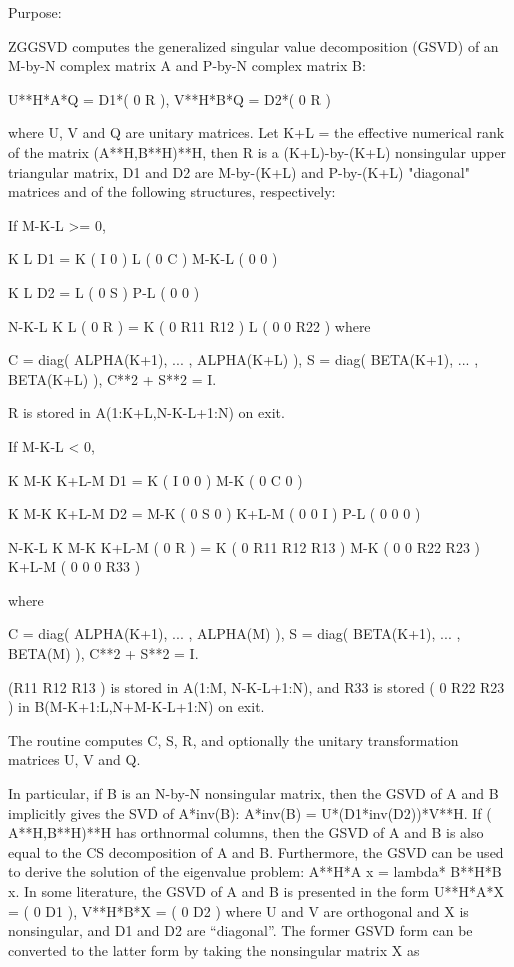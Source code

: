  \begin{DoxyParagraph}{Purpose\+: }
\begin{DoxyVerb} ZGGSVD computes the generalized singular value decomposition (GSVD)
 of an M-by-N complex matrix A and P-by-N complex matrix B:

       U**H*A*Q = D1*( 0 R ),    V**H*B*Q = D2*( 0 R )

 where U, V and Q are unitary matrices.
 Let K+L = the effective numerical rank of the
 matrix (A**H,B**H)**H, then R is a (K+L)-by-(K+L) nonsingular upper
 triangular matrix, D1 and D2 are M-by-(K+L) and P-by-(K+L) "diagonal"
 matrices and of the following structures, respectively:

 If M-K-L >= 0,

                     K  L
        D1 =     K ( I  0 )
                 L ( 0  C )
             M-K-L ( 0  0 )

                   K  L
        D2 =   L ( 0  S )
             P-L ( 0  0 )

                 N-K-L  K    L
   ( 0 R ) = K (  0   R11  R12 )
             L (  0    0   R22 )
 where

   C = diag( ALPHA(K+1), ... , ALPHA(K+L) ),
   S = diag( BETA(K+1),  ... , BETA(K+L) ),
   C**2 + S**2 = I.

   R is stored in A(1:K+L,N-K-L+1:N) on exit.

 If M-K-L < 0,

                   K M-K K+L-M
        D1 =   K ( I  0    0   )
             M-K ( 0  C    0   )

                     K M-K K+L-M
        D2 =   M-K ( 0  S    0  )
             K+L-M ( 0  0    I  )
               P-L ( 0  0    0  )

                    N-K-L  K   M-K  K+L-M
   ( 0 R ) =     K ( 0    R11  R12  R13  )
               M-K ( 0     0   R22  R23  )
             K+L-M ( 0     0    0   R33  )

 where

   C = diag( ALPHA(K+1), ... , ALPHA(M) ),
   S = diag( BETA(K+1),  ... , BETA(M) ),
   C**2 + S**2 = I.

   (R11 R12 R13 ) is stored in A(1:M, N-K-L+1:N), and R33 is stored
   ( 0  R22 R23 )
   in B(M-K+1:L,N+M-K-L+1:N) on exit.

 The routine computes C, S, R, and optionally the unitary
 transformation matrices U, V and Q.

 In particular, if B is an N-by-N nonsingular matrix, then the GSVD of
 A and B implicitly gives the SVD of A*inv(B):
                      A*inv(B) = U*(D1*inv(D2))*V**H.
 If ( A**H,B**H)**H has orthnormal columns, then the GSVD of A and B is also
 equal to the CS decomposition of A and B. Furthermore, the GSVD can
 be used to derive the solution of the eigenvalue problem:
                      A**H*A x = lambda* B**H*B x.
 In some literature, the GSVD of A and B is presented in the form
                  U**H*A*X = ( 0 D1 ),   V**H*B*X = ( 0 D2 )
 where U and V are orthogonal and X is nonsingular, and D1 and D2 are
 ``diagonal''.  The former GSVD form can be converted to the latter
 form by taking the nonsingular matrix X as


\end{DoxyVerb}
\end{DoxyParagraph}
